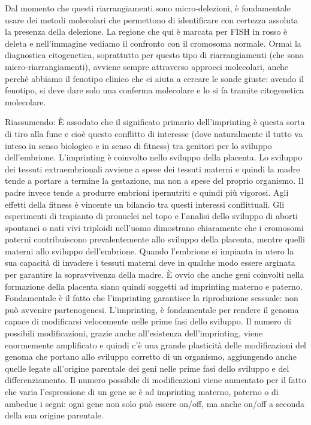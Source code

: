 \documentclass[11pt]{book}
\begin{document}
Dal momento che questi riarrangiamenti sono micro-delezioni, è fondamentale usare dei metodi molecolari che permettono di identificare con certezza assoluta la presenza della delezione. La regione che qui è marcata per FISH in rosso è deleta e nell’immagine vediamo il confronto con il cromosoma normale. 
Ormai la diagnostica citogenetica, soprattutto per questo tipo di riarrangiamenti (che sono micro-riarrangiamenti), avviene sempre attraverso approcci molecolari, anche perchè abbiamo il fenotipo clinico che ci aiuta a cercare le sonde giuste: avendo il fenotipo, si deve dare solo una conferma molecolare e lo si fa tramite citogenetica molecolare.

Riassumendo:
È assodato che il significato primario dell’imprinting è questa sorta di tiro alla fune e cioè questo conflitto di interesse (dove naturalmente il tutto va inteso in senso biologico e in senso di fitness) tra genitori per lo sviluppo dell’embrione.
L’imprinting è coinvolto nello sviluppo della placenta. Lo sviluppo dei tessuti extraembrionali avviene a spese dei tessuti materni e quindi la madre tende a portare a termine la gestazione, ma non a spese del proprio organismo. Il padre invece tende a produrre embrioni ipernutriti e quindi più vigorosi.
Agli effetti della fitness è vincente un bilancio tra questi interessi conflittuali. 
Gli esperimenti di trapianto di pronuclei nel topo e l’analisi dello sviluppo di aborti spontanei o nati vivi triploidi nell’uomo dimostrano chiaramente che i cromosomi paterni contribuiscono prevalentemente allo sviluppo della placenta, mentre quelli materni allo sviluppo dell’embrione.
Quando l’embrione si impianta in utero la sua capacità di invadere i tessuti materni deve in qualche modo essere arginata per garantire la sopravvivenza della madre.
È ovvio che anche geni coinvolti nella formazione della placenta siano quindi soggetti ad imprinting materno e paterno.
Fondamentale è il fatto che l’imprinting garantisce la riproduzione sessuale: non può avvenire partenogenesi.
L’imprinting, è fondamentale per rendere il genoma capace di modificarsi velocemente nelle prime fasi dello sviluppo. 
Il numero di possibili modificazioni, grazie anche all’esistenza dell’imprinting, viene enormemente amplificato e quindi c’è una grande plasticità delle modificazioni del genoma che portano allo sviluppo corretto di un organismo, aggiungendo anche quelle legate all’origine parentale dei geni nelle prime fasi dello sviluppo e del differenziamento. Il numero possibile di modificazioni viene aumentato per il fatto che varia l’espressione di un gene  se è ad imprinting materno, paterno o di ambedue i segni: ogni gene non solo può essere on/off, ma anche on/off a seconda della sua origine parentale. 
\end{document}
